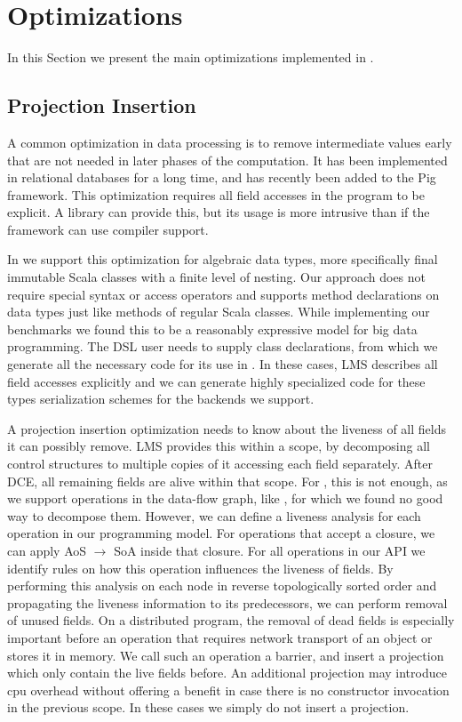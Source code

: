 \section{Optimizations}
\label{sec:optimizations}
In this Section we present the main optimizations implemented in \tool.
\subsection{Projection Insertion}
\label{sec:field-reduction}
\newcommand{\aos}{AoS $\rightarrow$ SoA }

A common optimization in data processing is to remove intermediate values early that are not needed in later phases of the computation. It has been implemented in relational databases for a long time, and has recently been added to the Pig framework. This optimization requires all field accesses in the program to be explicit. A library can provide this, but its usage is more intrusive than if the framework can use compiler support. 

In \tool we support this optimization for algebraic data types, more specifically final immutable Scala classes with a finite level of nesting. Our approach does not require special syntax or access operators and supports method declarations on data types just like methods of regular Scala classes. While implementing our benchmarks we found this to be a reasonably expressive model for big data programming. The DSL user needs to supply class declarations, from which we generate all the necessary code for its use in \tool. In these cases, LMS describes all field accesses explicitly and we can generate highly specialized code for these types serialization schemes for the backends we support.

A projection insertion optimization needs to know about the liveness of all fields it can possibly remove. LMS provides this within a scope, by decomposing all control structures to multiple copies of it accessing each field separately. After DCE, all remaining fields are alive within that scope. For \tool, this is not enough, as we support operations in the data-flow graph, like , for which we found no good way to decompose them. However, we can define a liveness analysis for each operation in our programming model. For operations that accept a closure, we can apply \aos inside that closure. For all operations in our API we identify rules on how this operation influences the liveness of fields. By performing this analysis on each node in reverse topologically sorted order and propagating the liveness information to its predecessors, we can perform removal of unused fields. On a distributed program, the removal of dead fields is especially important before an operation that requires network transport of an object or stores it in memory. We call such an operation a barrier, and insert a projection which only contain the live fields before. An additional projection may introduce cpu overhead without offering a benefit in case there is no constructor invocation in the previous scope. In these cases we simply do not insert a projection.

